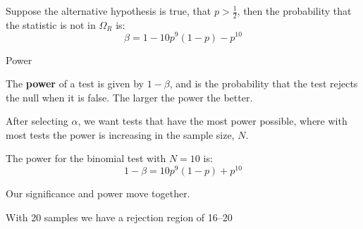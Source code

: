 \documentclass{beamer}
\begin{document}
\begin{frame}
	\begin{card}
 Suppose the alternative hypothesis is true, that $p>\tfrac{1}{2}$, then
the probability that the statistic is not in $\Omega_R$ is:
		$$\beta= 1-10 p^{9}(1-p)-p^{10}$$
	\end{card}

\begin{center}\end{center}
\end{frame}	


\begin{frame}{Power}
	\begin{card}
 The \textbf{power} of a test is given by $1-\beta$, and is the probability that the test rejects the null when it is false. The larger the power the better.
 \end{card}
\begin{card} After selecting $\alpha$, we want tests that have the most power possible, where with most tests the power is increasing in the sample size, $N$.
\end{card}
\end{frame}

\begin{frame}
	\begin{card}
The power for the binomial test with $N=10$ is:
		$$1-\beta=10 p^{9}(1-p)+p^{10}$$
	\end{card}
	
\begin{center}\end{center}
\end{frame}

\begin{frame}
	\begin{card}Our significance and power move together. 
	
	With 20 samples we have a rejection region of 16--20
	\end{card}

\begin{center}\end{center}
\end{frame}
\end{document}
